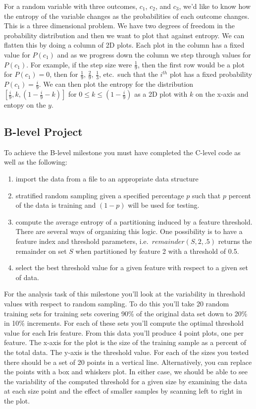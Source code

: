 \documentclass[]{tufte-handout}
\begin{document}
For a random variable with three outcomes, $c_1$, $c_2$, and $c_3$, we'd like to know how the entropy of the variable changes as the probabilities of each outcome changes. This is a three dimensional problem. We have two degrees of freedom in the probability distribution and then we want to plot that against entropy. We can flatten this by doing a column of 2D plots. Each plot in the column has a fixed value for $P(c_1)$ and as we progress down the column we step through values for $P(c_1)$. For example, if the step size were $\frac{1}{9}$, then the first row would be a plot for $P(c_1)=0$, then for $\frac{1}{9}$, $\frac{2}{9}$, $\frac{1}{3}$, etc.\ such that the $i^{th}$ plot has a fixed probability $P(c_1)=\frac{i}{9}$. We can then plot the entropy for the distribution $[\frac{i}{9},k,(1-\frac{i}{9}-k) ]$ for $0 \leq k \leq (1-\frac{i}{9})$ as a 2D plot with $k$ on the x-axis and entopy on the $y$. 

\subsection*{B-level Project}

To achieve the B-level milestone you must have completed the C-level code as well as the following:
\begin{enumerate}
  \item import the data from a file to an appropriate data structure
  \item stratified random sampling given a specified percentage $p$ such that $p$ percent of the data is training and $(1-p)$ will be used for testing.
  \item compute the average entropy of a partitioning induced by a feature threshold. There are several ways of organizing this logic. One possibility is to have a feature index and threshold parameters, i.e.\ $remainder(S,2,.5)$ returns the remainder on set $S$ when partitioned by feature 2 with a threshold of 0.5.
  \item select the best threshold value for a given feature with respect to a given set of data.
\end{enumerate}

For the analysis task of this milestone you'll look at the variability in threshold values with respect to random sampling. To do this you'll take 20 random training sets for training sets covering 90\% of the original data set down to 20\% in 10\% increments. For each of these sets you'll compute the optimal threshold value for each Iris feature. From this data you'll produce 4 point plots, one per feature. The x-axis for the plot is the size of the training sample as a percent of the total data. The y-axis is the threshold value. For each of the sizes you tested there should be a set of 20 points in a vertical line. Alternatively, you can replace the points with a box and whiskers plot. In either case, we should be able to see the variability of the computed threshold for a given size by examining the data at each size point and the effect of smaller samples by scanning left to right in the plot.
\end{document}
